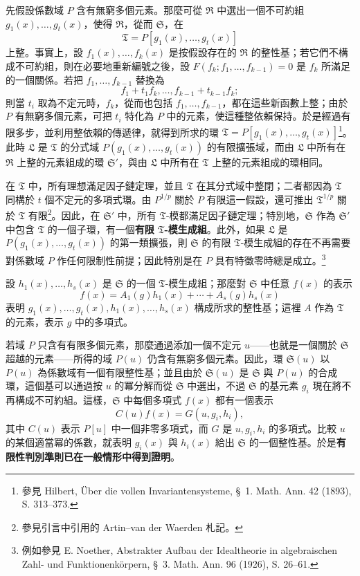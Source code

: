 \documentclass[11pt]{article}
\newcommand{\srcemph}[1]{\textbf{#1}}
\begin{document}
先假設係數域 $P$ 含有無窮多個元素。那麼可從 $\mathfrak R$ 中選出一個不可約組 $g_1(x),\ldots,g_t(x)$，使得 $\mathfrak R$，從而 $\mathfrak S$，在
\[
 \mathfrak T=P[g_1(x),\ldots,g_t(x)]
\]
上整。事實上，設 $f_1(x),\ldots,f_k(x)$ 是按假設存在的 $\mathfrak R$ 的整性基；若它們不構成不可約組，則在必要地重新編號之後，設 $F(f_k;f_1,\ldots,f_{k-1})=0$ 是 $f_k$ 所滿足的一個關係。若把 $f_1,\ldots,f_{k-1}$ 替換為
\[
 f_1+t_1f_k,\ldots,f_{k-1}+t_{k-1}f_k;
\]
則當 $t_i$ 取為不定元時，$f_k$，從而也包括 $f_1,\ldots,f_{k-1}$，都在這些新函數上整；由於 $P$ 有無窮多個元素，可把 $t_i$ 特化為 $P$ 中的元素，使這種整依賴保持。於是經過有限多步，並利用整依賴的傳遞律，就得到所求的環 $\mathfrak T=P[g_1(x),\ldots,g_t(x)]$\footnote{參見 Hilbert, Über die vollen Invariantensysteme, \S\ 1. Math. Ann. 42 (1893), S. 313--373.}。此時 $\mathfrak L$ 是 $\mathfrak T$ 的分式域 $P(g_1(x),\ldots,g_t(x))$ 的有限擴張域，而由 $\mathfrak L$ 中所有在 $\mathfrak R$ 上整的元素組成的環 $\mathfrak S'$，與由 $\mathfrak L$ 中所有在 $\mathfrak T$ 上整的元素組成的環相同。

在 $\mathfrak T$ 中，所有理想滿足因子鏈定理，並且 $\mathfrak T$ 在其分式域中整閉；二者都因為 $\mathfrak T$ 同構於 $t$ 個不定元的多項式環。由 $P^{1/p}$ 關於 $P$ 有限這一假設，還可推出 $\mathfrak T^{1/p}$ 關於 $\mathfrak T$ 有限\footnote{參見引言中引用的 Artin--van der Waerden 札記。}。因此，在 $\mathfrak S'$ 中，所有 $\mathfrak T$-模都滿足因子鏈定理；特別地，$\mathfrak S$ 作為 $\mathfrak S'$ 中包含 $\mathfrak T$ 的一個子環，有一個\srcemph{有限 $\mathfrak T$-模生成組}\footnotemark[\value{footnote}]。此外，如果 $\mathfrak L$ 是 $P(g_1(x),\ldots,g_t(x))$ 的第一類擴張，則 $\mathfrak S$ 的有限 $\mathfrak T$-模生成組的存在不再需要對係數域 $P$ 作任何限制性前提；因此特別是在 $P$ 具有特徵零時總是成立。\footnote{例如參見 E. Noether, Abstrakter Aufbau der Idealtheorie in algebraischen Zahl- und Funktionenkörpern, \S\ 3. Math. Ann. 96 (1926), S. 26--61.}

設 $h_1(x),\ldots,h_s(x)$ 是 $\mathfrak S$ 的一個 $\mathfrak T$-模生成組；那麼對 $\mathfrak S$ 中任意 $f(x)$ 的表示
\[
 f(x)=A_1(g)h_1(x)+\cdots+A_s(g)h_s(x)
\]
表明 $g_1(x),\ldots,g_t(x),h_1(x),\ldots,h_s(x)$ 構成所求的整性基；這裡 $A$ 作為 $\mathfrak T$ 的元素，表示 $g$ 中的多項式。

若域 $P$ 只含有有限多個元素，那麼通過添加一個不定元 $u$——也就是一個關於 $\mathfrak S$ 超越的元素——所得的域 $P(u)$ 仍含有無窮多個元素。因此，環 $\mathfrak S(u)$ 以 $P(u)$ 為係數域有一個有限整性基；並且由於 $\mathfrak S(u)$ 是 $\mathfrak S$ 與 $P(u)$ 的合成環，這個基可以通過按 $u$ 的冪分解而從 $\mathfrak S$ 中選出，不過 $\mathfrak S$ 的基元素 $g_i$ 現在將不再構成不可約組。這樣，$\mathfrak S$ 中每個多項式 $f(x)$ 都有一個表示
\[
 C(u)f(x)=G(u,g_i,h_i),
\]
其中 $C(u)$ 表示 $P[u]$ 中一個非零多項式，而 $G$ 是 $u,g_i,h_i$ 的多項式。比較 $u$ 的某個適當冪的係數，就表明 $g_i(x)$ 與 $h_i(x)$ 給出 $\mathfrak S$ 的一個整性基。於是\srcemph{有限性判別準則已在一般情形中得到證明}。
\end{document}
